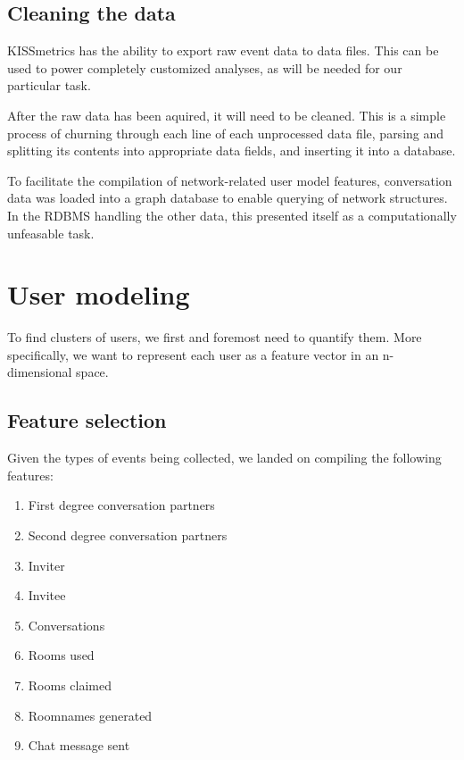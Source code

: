 \subsection{Cleaning the data}
\label{sub:cleaning_data}

KISSmetrics has the ability to export raw event data to data files. This can be used to power completely customized analyses, as will be needed for our particular task.

After the raw data has been aquired, it will need to be cleaned. This is a simple process of churning through each line of each unprocessed data file, parsing and splitting its contents into appropriate data fields, and inserting it into a database.

To facilitate the compilation of network-related user model features, conversation data was loaded into a graph database to enable querying of network structures. In the RDBMS handling the other data, this presented itself as a computationally unfeasable task.


\section{User modeling} %
\label{sec:user_modeling}

To find clusters of users, we first and foremost need to quantify them. More specifically, we want to represent each user as a feature vector in an n-dimensional space.

\subsection{Feature selection}
\label{sub:feature_selection}

Given the types of events being collected, we landed on compiling the following features:

\begin{enumerate}
  \item First degree conversation partners
  \item Second degree conversation partners
  \item Inviter
  \item Invitee
  \item Conversations
  \item Rooms used
  \item Rooms claimed
  \item Roomnames generated
  \item Chat message sent
\end{enumerate}

